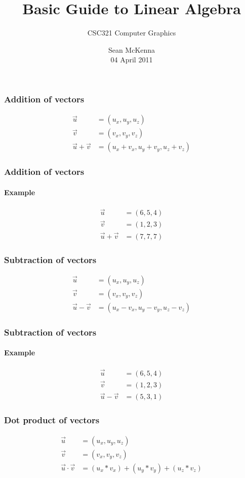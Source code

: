 \documentclass[xcolor=dvipsnames]{beamer}
\title{Basic Guide to Linear Algebra}
\author{CSC321 Computer Graphics}
\date{Sean McKenna
\\ 04 April 2011}
\begin{document}
  \maketitle

\begin{frame}
\frametitle{Addition of vectors}
  \begin{align*}
    \vec{u} & = (u_x, u_y, u_z) \\
    \vec{v} & = (v_x, v_y, v_z) \\
    \vec{u} + \vec{v} & = (u_x + v_x, u_y + v_y, u_z + v_z)
    \end{align*}
  \end{frame}

\begin{frame}
\frametitle{Addition of vectors}
\framesubtitle{Example}
  \begin{align*}
    \vec{u} & = (6, 5, 4) \\
    \vec{v} & = (1, 2, 3) \\
    \vec{u} + \vec{v} & = (7, 7, 7)
    \end{align*}
  \end{frame}

\begin{frame}
\frametitle{Subtraction of vectors}
  \begin{align*}
    \vec{u} & = (u_x, u_y, u_z) \\
    \vec{v} & = (v_x, v_y, v_z) \\
    \vec{u} - \vec{v} & = (u_x - v_x, u_y - v_y, u_z - v_z)
    \end{align*}
  \end{frame}

\begin{frame}
\frametitle{Subtraction of vectors}
\framesubtitle{Example}
  \begin{align*}
    \vec{u} & = (6, 5, 4) \\
    \vec{v} & = (1, 2, 3) \\
    \vec{u} - \vec{v} & = (5, 3, 1)
    \end{align*}
  \end{frame}

\begin{frame}
\frametitle{Dot product of vectors}
  \begin{align*}
    \vec{u} & = (u_x, u_y, u_z) \\
    \vec{v} & = (v_x, v_y, v_z) \\
    \vec{u} \cdot \vec{v} & = (u_x * v_x) + (u_y * v_y) + (u_z * v_z)
    \end{align*}
  \end{frame}
\end{document}
